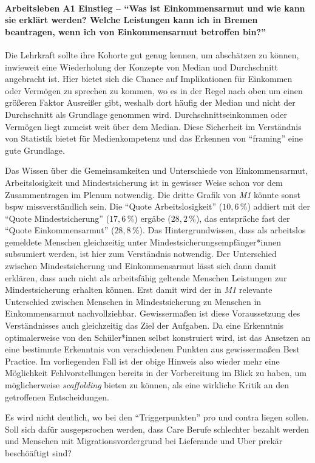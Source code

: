 \paragraph{Arbeitsleben A1 Einstieg -- \enquote{Was ist Einkommensarmut und wie kann sie erklärt werden? Welche Leistungen kann ich in Bremen beantragen, wenn ich von Einkommensarmut betroffen bin?}}
Die Lehrkraft sollte ihre Kohorte gut genug kennen, um abschätzen zu können, inwieweit eine Wiederholung der Konzepte von Median und Durchschnitt angebracht ist. Hier bietet sich die Chance auf Implikationen für Einkommen oder Vermögen zu sprechen zu kommen, wo es in der Regel nach oben um einen größeren Faktor Ausreißer gibt, weshalb dort häufig der Median und nicht der Durchschnitt als Grundlage genommen wird. Durchschnittseinkommen oder Vermögen liegt zumeist weit über dem Median. Diese Sicherheit im Verständnis von Statistik bietet für Medienkompetenz und das Erkennen von \enquote{framing} eine gute Grundlage.

Das Wissen über die Gemeinsamkeiten und Unterschiede von Einkommensarmut, Arbeitslosigkeit und Mindestsicherung ist in gewisser Weise schon vor dem Zusammentragen im Plenum notwendig. 
Die dritte Grafik von \emph{M1} könnte sonst \gls{bspw} missverständlich sein. Die \enquote{Quote Arbeitslosigkeit} ($10,6\,\%$) addiert mit der \enquote{Quote Mindestsicherung} ($17,6\,\%$) ergäbe ($28,2\,\%$), das entspräche fast der \enquote{Quote Einkommensarmut} ($28,8\,\%$). Das Hintergrundwissen, dass als arbeitslos gemeldete Menschen gleichzeitig unter Mindestsicherungsempfänger*innen subsumiert werden, ist hier zum Verständnis notwendig. Der Unterschied zwischen Mindestsicherung und Einkommensarmut lässt sich dann damit erklären, dass auch nicht als arbeitsfähig geltende Menschen Leistungen zur Mindestsicherung erhalten können. Erst damit wird der in \emph{M1} relevante Unterschied zwischen Menschen in Mindestsicherung zu Menschen in Einkommensarmut nachvollziehbar. Gewissermaßen ist diese Voraussetzung des Verständnisses auch gleichzeitig das Ziel der Aufgaben. Da eine Erkenntnis optimalerweise von den Schüler*innen selbst konstruiert wird, ist das Ansetzen an eine bestimmte Erkenntnis von verschiedenen Punkten aus gewissermaßen Best Practice. Im vorliegenden Fall ist der obige Hinweis also wieder mehr eine Möglichkeit Fehlvorstellungen bereits in der Vorbereitung im Blick zu haben, um möglicherweise \emph{scaffolding} bieten zu können, als eine wirkliche Kritik an den getroffenen Entscheidungen. 

Es wird nicht deutlich, wo bei den \enquote{Triggerpunkten} pro und contra liegen sollen. Soll sich dafür ausgepsrochen werden, dass Care Berufe schlechter bezahlt werden und Menschen mit Migrationsvordergrund bei Lieferande und Uber prekär beschöäftigt sind? 

